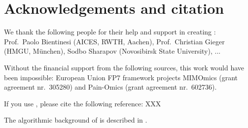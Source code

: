 \chapter{Acknowledgements and citation}
We thank the following people for their help and support in creating
\oanomm: Prof.~Paolo Bientinesi (AICES, RWTH, Aachen), Prof.~Christian
Gieger (HMGU, München), Sodbo Sharapov (Novosibirsk State University), ...

Without the financial support from the following sources, this work
would have been impossible: European Union FP7 framework projects
MIMOmics (grant agreement nr.~305280) and Pain-Omics (grant agreement
nr.~602736).

If you use \oanomm, please cite the following reference: XXX

The algorithmic background of \oanomm is described in \cite{Frank2016}.


